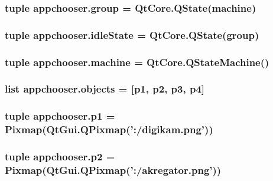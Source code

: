 \subsubsection[{group}]{\setlength{\rightskip}{0pt plus 5cm}tuple appchooser.\+group = Qt\+Core.\+Q\+State({\bf machine})}\label{namespaceappchooser_a4cba4601f9776cb9ed1bfc83873f329e}
\hypertarget{namespaceappchooser_ac69e258bbe16049879b2e76c3cef39d8}{}
\subsubsection[{idle\+State}]{\setlength{\rightskip}{0pt plus 5cm}tuple appchooser.\+idle\+State = Qt\+Core.\+Q\+State({\bf group})}\label{namespaceappchooser_ac69e258bbe16049879b2e76c3cef39d8}
\hypertarget{namespaceappchooser_aa1ec60a035b0714db259d8f2a52a614d}{}
\subsubsection[{machine}]{\setlength{\rightskip}{0pt plus 5cm}tuple appchooser.\+machine = Qt\+Core.\+Q\+State\+Machine()}\label{namespaceappchooser_aa1ec60a035b0714db259d8f2a52a614d}
\hypertarget{namespaceappchooser_a1a06713bdd14d024a6bd4701471b80b1}{}
\subsubsection[{objects}]{\setlength{\rightskip}{0pt plus 5cm}list appchooser.\+objects = \mbox{[}{\bf p1}, {\bf p2}, {\bf p3}, {\bf p4}\mbox{]}}\label{namespaceappchooser_a1a06713bdd14d024a6bd4701471b80b1}
\hypertarget{namespaceappchooser_a0666ded3ab0286b6d03073e3a3c8c578}{}
\subsubsection[{p1}]{\setlength{\rightskip}{0pt plus 5cm}tuple appchooser.\+p1 = {\bf Pixmap}(Qt\+Gui.\+Q\+Pixmap('\+:/digikam.\+png'))}\label{namespaceappchooser_a0666ded3ab0286b6d03073e3a3c8c578}
\hypertarget{namespaceappchooser_a64961f0ddcc5bc14c7ae51cc891f6d05}{}
\subsubsection[{p2}]{\setlength{\rightskip}{0pt plus 5cm}tuple appchooser.\+p2 = {\bf Pixmap}(Qt\+Gui.\+Q\+Pixmap('\+:/akregator.\+png'))}\label{namespaceappchooser_a64961f0ddcc5bc14c7ae51cc891f6d05}
\hypertarget{namespaceappchooser_a5b229def25670d69ce74fb6b77c1ca4e}{}
